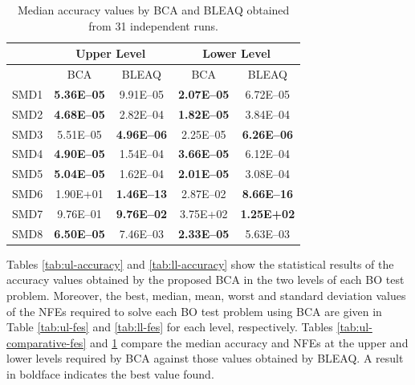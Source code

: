 \documentclass[conference]{IEEEtran}
\begin{document}
\begin{table}[!ht]
\renewcommand{\arraystretch}{1.3}
    \caption{Median accuracy values by BCA and BLEAQ obtained from 31 independent runs.}
    \label{tab:ll-comparative-vals}
    \centering
    \begin{tabular}{|c|c|c||c|c|}
\hline
& \multicolumn{2}{c||}{Upper Level} & \multicolumn{2}{c|}{Lower Level} \\ \hline
& BCA & BLEAQ & BCA & BLEAQ \\ \hline
SMD1  & \textbf{5.36E--05} & 9.91E--05 & \textbf{2.07E--05} & 6.72E--05 \\ \hline
SMD2  & \textbf{4.68E--05} & 2.82E--04 & \textbf{1.82E--05} & 3.84E--04 \\ \hline
SMD3  & 5.51E--05 & \textbf{4.96E--06} & 2.25E--05 & \textbf{6.26E--06} \\ \hline
SMD4  & \textbf{4.90E--05} & 1.54E--04 & \textbf{3.66E--05} & 6.12E--04 \\ \hline
SMD5  & \textbf{5.04E--05} & 1.62E--04 & \textbf{2.01E--05} & 3.08E--04 \\ \hline
SMD6  &  1.90E+01 & \textbf{1.46E--13} & 2.87E--02 & \textbf{8.66E--16} \\ \hline
SMD7  & 9.76E--01 & \textbf{9.76E--02} &  3.75E+02 &  \textbf{1.25E+02} \\ \hline
SMD8  & \textbf{6.50E--05} & 7.46E--03 & \textbf{2.33E--05} & 5.63E--03 \\ \hline

    \end{tabular}
\end{table}






Tables \ref{tab:ul-accuracy} and \ref{tab:ll-accuracy} show the statistical results
of the accuracy values obtained by the proposed BCA in the two levels of each BO
test problem. Moreover, the best, median, mean, worst and standard deviation values
of the NFEs required to solve each BO test problem using BCA are given in
Table \ref{tab:ul-fes} and \ref{tab:ll-fes} for each level, respectively. 
Tables \ref{tab:ul-comparative-fes} and \ref{tab:ll-comparative-vals} compare the
median accuracy and NFEs at the upper and lower levels required by BCA against
those values obtained by BLEAQ. A result in boldface indicates the best value found.
\end{document}
